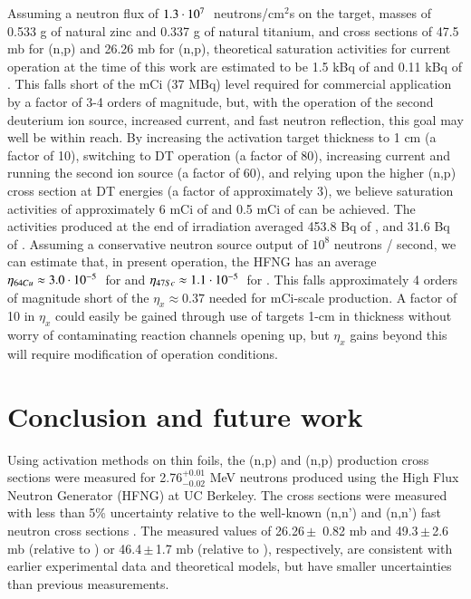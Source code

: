 Assuming a neutron flux of  $1.3 \cdot 10^{7}\ $ neutrons/cm$^2$s on the target, masses of 0.533 g of natural zinc and 0.337 g of natural titanium, and cross sections of 47.5 mb for (n,p)   and 26.26  mb for  (n,p), theoretical saturation activities for current operation at the time of this work are estimated to be 1.5 kBq of  and 0.11 kBq of .
This falls short of the mCi (37 MBq) level required for commercial application by a factor of 3-4 orders of magnitude, but,  with the operation of the second deuterium ion source, increased current, and fast neutron reflection, this goal may  well be within reach. 
By increasing the activation target thickness to 1 cm (a factor of 10), switching to DT operation (a factor of 80), increasing current and running the second ion source (a factor of 60), and relying upon the higher (n,p) cross section at DT energies (a factor of approximately 3), we believe saturation activities of approximately 6 mCi of  and 0.5 mCi of  can be achieved.  
The activities produced at the end of irradiation averaged 453.8 Bq of , and 31.6 Bq of .
Assuming a conservative neutron source output of $10^8$ neutrons / second, we can estimate that, in present operation, the HFNG has an average $\eta_{64Cu} \approx 3.0 \cdot 10^{-5}\ $ for  and $\eta_{47Sc} \approx 1.1 \cdot 10^{-5}\ $ for  . 
This falls approximately 4 orders of magnitude short of the $\eta_x \approx 0.37$ needed for mCi-scale production.
A factor of 10 in $\eta_x$ could easily be gained through use of targets  1-cm in thickness without worry of contaminating reaction channels opening up, but $\eta_x$ gains beyond this will require modification of operation conditions.   
 
 
 
 \section{Conclusion and future work}

Using activation methods on thin foils, the (n,p) and (n,p) production cross sections were measured for  2.76$^{+0.01}_{-0.02}$ MeV neutrons produced using the High Flux Neutron Generator (HFNG) at UC Berkeley.
The cross sections were measured with less than  5\% uncertainty relative to the well-known (n,n') and (n,n') fast neutron cross sections \cite{Capote2012,zsolnay2012technical}.
The measured values of  26.26\,$\pm$\, 0.82 mb and  49.3\,$\pm$\,2.6 mb (relative to ) or 46.4\,$\pm$\,1.7 mb (relative to ), respectively, are consistent with earlier experimental data and theoretical models, but have smaller uncertainties than previous measurements.
 
